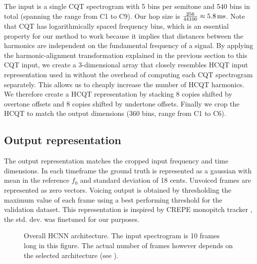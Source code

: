 \documentclass{article}
\begin{document}
The input is a single CQT spectrogram with 5 bins per semitone and 540 bins in total (spanning the range from C1 to C9). Our hop size is $\frac{256}{44100} \approx 5.8\,\rm ms$. Note that CQT has logarithmically spaced frequency bins, which is an essential property for our method to work because it implies that distances between the harmonics are independent on the fundamental frequency of a signal. By applying the harmonic-alignment transformation explained in the previous section to this CQT input, we create a 3-dimensional array that closely resembles HCQT input representation used in \cite{Bittner2017} without the overhead of computing each CQT spectrogram separately. This allows us to cheaply increase the number of HCQT harmonics. We therefore create a HCQT representation by stacking 8 copies shifted by overtone offsets and 8 copies shifted by undertone offsets. Finally we crop the HCQT to match the output dimensions (360 bins, range from C1 to C6).

\subsection{Output representation}

The output representation matches the cropped input frequency and time dimensions. In each timeframe the ground truth is represented as a gaussian with mean in the reference $f_0$ and standard deviation of 18 cents. Unvoiced frames are represented as zero vectors. Voicing output is obtained by thresholding the maximum value of each frame using a best performing threshold for the validation dataset. This representation is inspired by CREPE monopitch tracker \cite{Kim2018}, the std. dev. was finetuned for our purposes.


\begin{figure}
 \centerline{}
 \caption{Overall HCNN architecture. The input spectrogram is 10 frames long in this figure. The actual number of frames however depends on the selected architecture (see ).}
 \label{fig:hcnn_overall}
\end{figure}
\end{document}
